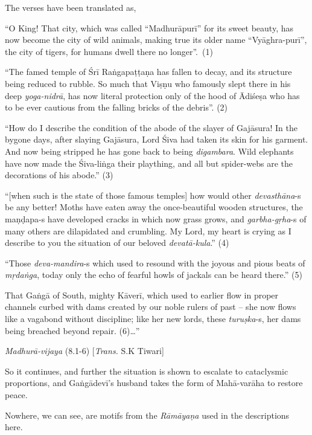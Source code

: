 The verses have been translated as, 

\begin{myquote}
“O King! That city, which was called “Madhurāpurī” for its sweet beauty, has now become the city of wild animals, making true its older name “Vyāghra-purī”, the city of tigers, for humans dwell there no longer”.~(1) 

“The famed temple of Śrī Raṅgapaṭṭaṇa has fallen to decay, and its structure being reduced to rubble. So much that Viṣṇu who famously slept there in his deep {\sl yoga-nidrā}, has now literal protection only of the hood of Ādiśeṣa who has to be ever cautious from the falling bricks of the debris”. (2) 

“How do I describe the condition of the abode of the slayer of Gajāsura! In the bygone days, after slaying Gajāsura, Lord Śiva had taken its skin for his garment. And now being stripped he has gone back to being {\sl digambara}. Wild elephants have now made the Śiva-liṅga their plaything, and all but spider-webs are the decorations of his abode.” (3) 

“[when such is the state of those famous temples] how would other {\sl devasthāna}-s be any better! Moths have eaten away the once-beautiful wooden structures, the maṇḍapa-s have developed cracks in which now grass grows, and {\sl garbha-gṛha}-s of many others are dilapidated and crumbling. My Lord, my heart is crying as I describe to you the situation of our beloved {\sl devatā-kula}.” (4) 

“Those {\sl deva-mandira}-s which used to resound with the joyous and pious beats of {\sl mṛdaṅga}, today only the echo of fearful howls of jackals can be heard there.” (5) 

That Gaṅgā of South, mighty Kāverī, which used to earlier flow in proper channels curbed with dams created by our noble rulers of past – she now flows like a vagabond without discipline; like her new lords, these {\sl turuṣka}-s, her dams being breached beyond repair. (6)…” 

\hfill {\sl Madhurā-vijaya} (8.1-6) [{\sl Trans.} S.K  Tiwari]
\end{myquote}

So it continues, and further the situation is shown to escalate to cataclysmic proportions, and Gaṅgādevī’s husband takes the form of Mahā-varāha to restore peace. 

Nowhere, we can see, are motifs from the {\sl Rāmāyaṇa} used in the descriptions here.  

